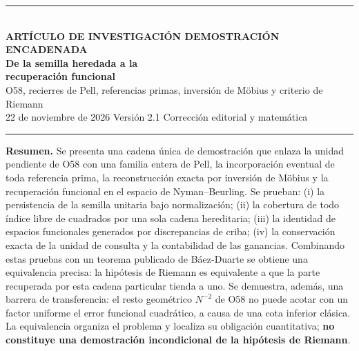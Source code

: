 \documentclass[11pt,a4paper]{article}
\theoremstyle{mine}
\theoremstyle{definition}
\begin{document}
\thispagestyle{empty}
\vspace*{8mm}
{\color{Copper}\rule{27mm}{1.7pt}}\\[14pt]
{\sffamily\small\bfseries\color{Copper} ARTÍCULO DE INVESTIGACIÓN \;\textbar\; DEMOSTRACIÓN ENCADENADA}\\[11pt]
{\fontsize{21}{25}\selectfont\bfseries\color{InkBlue}De la semilla heredada a la\\[3pt]recuperación funcional}\\[9pt]
{\fontsize{12.5}{17}\selectfont\color{Faint}O58, recierres de Pell, referencias primas, inversión de Möbius y criterio de Riemann}\\[12pt]
{\small 22 de noviembre de 2026 \;\textbar\; Versión 2.1 \;\textbar\; Corrección editorial y matemática}\\[10pt]
\rule{\linewidth}{.55pt}
\vspace{3pt}
\textbf{Resumen.} Se presenta una cadena única de demostración que enlaza la unidad pendiente de O58 con una familia entera de Pell, la incorporación eventual de toda referencia prima, la reconstrucción exacta por inversión de Möbius y la recuperación funcional en el espacio de Nyman--Beurling. Se prueban: (i) la persistencia de la semilla unitaria bajo normalización; (ii) la cobertura de todo índice libre de cuadrados por una sola cadena hereditaria; (iii) la identidad de espacios funcionales generados por discrepancias de criba; (iv) la conservación exacta de la unidad de consulta y la contabilidad de las ganancias. Combinando estas pruebas con un teorema publicado de Báez-Duarte se obtiene una equivalencia precisa: la hipótesis de Riemann es equivalente a que la parte recuperada por esta cadena particular tienda a uno. Se demuestra, además, una barrera de transferencia: el resto geométrico $N^{-2}$ de O58 no puede acotar con un factor uniforme el error funcional cuadrático, a causa de una cota inferior clásica. La equivalencia organiza el problema y localiza su obligación cuantitativa; \textbf{no constituye una demostración incondicional de la hipótesis de Riemann}.
\end{document}

